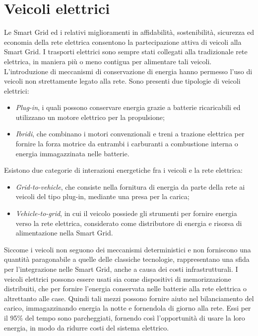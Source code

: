 \section{Veicoli elettrici}
Le Smart Grid ed i relativi miglioramenti in affidabilità, sostenibilità, sicurezza ed economia della rete elettrica consentono la partecipazione attiva di veicoli alla Smart Grid. I trasporti elettrici sono sempre stati collegati alla tradizionale rete elettrica, in maniera più o meno contigua per alimentare tali veicoli. L'introduzione di meccanismi di conservazione di energia hanno permesso l'uso di veicoli non strettamente legato alla rete.
Sono presenti due tipologie di veicoli elettrici:
\begin{itemize}
	\item \emph{Plug-in}, i quali possono conservare energia grazie a batterie ricaricabili ed utilizzano un motore elettrico per la propulsione;
	\item \emph{Ibridi}, che combinano i motori convenzionali e treni a trazione elettrica per fornire la forza motrice da entrambi i carburanti a combustione interna o energia immagazzinata nelle batterie.  
\end{itemize}     

Esistono due categorie di interazioni energetiche fra i veicoli e la rete elettrica:
\begin{itemize}
	\item \emph{Grid-to-vehicle}, che consiste nella fornitura di energia da parte della rete ai veicoli del tipo plug-in, mediante una presa per la carica;
	\item \emph{Vehicle-to-grid}, in cui il veicolo possiede gli strumenti per fornire energia verso la rete elettrica, considerato come distributore di energia e risorsa di alimentazione nella Smart Grid.
\end{itemize}

Siccome i veicoli non seguono dei meccanismi deterministici e non forniscono una quantità paragonabile a quelle delle classiche tecnologie, rappresentano una sfida per l'integrazione nelle Smart Grid, anche a causa dei costi infrastrutturali. 
I veicoli elettrici possono essere usati sia come dispositivi di memorizzazione distribuiti, che per fornire l'energia conservata nelle batterie alla rete elettrica o altrettanto alle case. 
Quindi tali mezzi possono fornire aiuto nel bilanciamento del carico, immagazzinando energia la notte e fornendola di giorno alla rete. Essi per il 95\% del tempo sono parcheggiati, fornendo così l'opportunità di usare la loro energia, in modo da ridurre costi del sistema elettrico.





